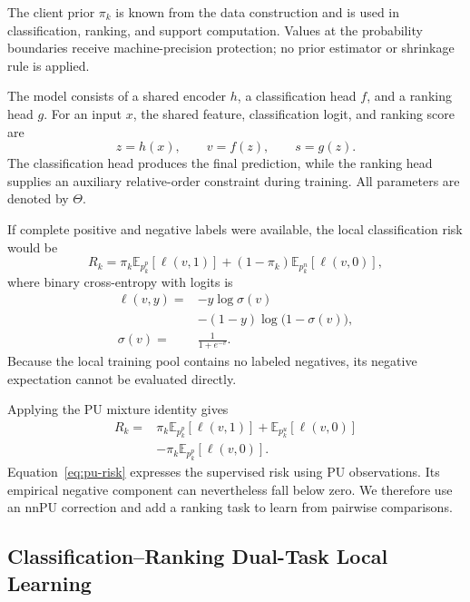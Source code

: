 \documentclass[lettersize,journal]{IEEEtran}
\begin{document}
The client prior $\pi_k$ is known from the data construction and is used in classification, ranking, and support computation. Values at the probability boundaries receive machine-precision protection; no prior estimator or shrinkage rule is applied.

The model consists of a shared encoder $h$, a classification head $f$, and a ranking head $g$. For an input $x$, the shared feature, classification logit, and ranking score are
\begin{equation}
z=h(x),\qquad v=f(z),\qquad s=g(z).
\label{eq:model-output}
\end{equation}
The classification head produces the final prediction, while the ranking head supplies an auxiliary relative-order constraint during training. All parameters are denoted by $\Theta$.

If complete positive and negative labels were available, the local classification risk would be
\begin{equation}
R_k=\pi_k\mathbb E_{p_k^p}[\ell(v,1)]
+(1-\pi_k)\mathbb E_{p_k^n}[\ell(v,0)],
\label{eq:supervised-risk}
\end{equation}
where binary cross-entropy with logits is
\begin{equation}
\begin{aligned}
\ell(v,y)={}&-y\log\sigma(v)\\
&-(1-y)\log\bigl(1-\sigma(v)\bigr),\\
\sigma(v)={}&\frac{1}{1+e^{-v}}.
\end{aligned}
\label{eq:bce}
\end{equation}
Because the local training pool contains no labeled negatives, its negative expectation cannot be evaluated directly.\par\noindent
Applying the PU mixture identity gives~\cite{ref_pu,ref_nnpu}
\begin{equation}
\begin{aligned}
R_k={}&\pi_k\mathbb E_{p_k^p}[\ell(v,1)]
+\mathbb E_{p_k^u}[\ell(v,0)]\\
&-\pi_k\mathbb E_{p_k^p}[\ell(v,0)].
\end{aligned}
\label{eq:pu-risk}
\end{equation}
Equation~\eqref{eq:pu-risk} expresses the supervised risk using PU observations. Its empirical negative component can nevertheless fall below zero. We therefore use an nnPU correction and add a ranking task to learn from pairwise comparisons.

\subsection{Classification--Ranking Dual-Task Local Learning}
\end{document}

